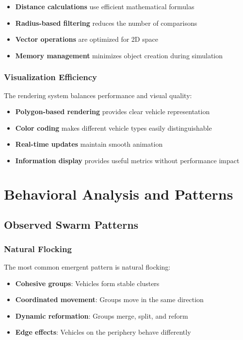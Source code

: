 \documentclass[12pt,a4paper]{article}
\begin{document}
\begin{itemize}
    \item \textbf{Distance calculations} use efficient mathematical formulas
    \item \textbf{Radius-based filtering} reduces the number of comparisons
    \item \textbf{Vector operations} are optimized for 2D space
    \item \textbf{Memory management} minimizes object creation during simulation
\end{itemize}

\subsubsection{Visualization Efficiency}
The rendering system balances performance and visual quality:

\begin{itemize}
    \item \textbf{Polygon-based rendering} provides clear vehicle representation
    \item \textbf{Color coding} makes different vehicle types easily distinguishable
    \item \textbf{Real-time updates} maintain smooth animation
    \item \textbf{Information display} provides useful metrics without performance impact
\end{itemize}

\section{Behavioral Analysis and Patterns}

\subsection{Observed Swarm Patterns}

\subsubsection{Natural Flocking}
The most common emergent pattern is natural flocking:

\begin{itemize}
    \item \textbf{Cohesive groups}: Vehicles form stable clusters
    \item \textbf{Coordinated movement}: Groups move in the same direction
    \item \textbf{Dynamic reformation}: Groups merge, split, and reform
    \item \textbf{Edge effects}: Vehicles on the periphery behave differently
\end{itemize}
\end{document}
